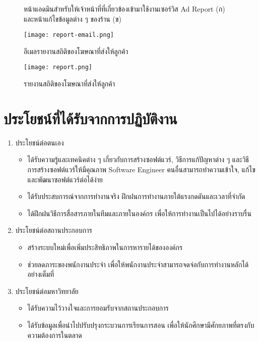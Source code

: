 \begin{figure}[!h]
	\centering
	\caption{หน้าแอดมินสำหรับให้เจ้าหน้าที่ที่เกี่ยวข้องเข้ามาใช้งานเซอร์วิส Ad Report (ก) และหน้าแก้ไขข้อมูลต่าง ๆ ของร้าน (ข)}
	\label{Fig:adminui}
\end{figure}

\begin{figure}[!h]
	\centering
	\texttt{[image: report-email.png]}  
	\caption{อีเมลรายงานสถิติของโฆษณาที่ส่งให้ลูกค้า}
	\label{Fig:report-email}
\end{figure}

\begin{figure}[!p]
	\centering
	\texttt{[image: report.png]}  
	\caption{รายงานสถิติของโฆษณาที่ส่งให้ลูกค้า}
	\label{Fig:report}
\end{figure}

\section{ประโยชน์ที่ได้รับจากการปฏิบัติงาน}
\begin{enumerate}
	\item ประโยชน์ต่อตนเอง
	\begin{itemize}
		\item ได้รับความรู้และเทคนิคต่าง ๆ เกี่ยวกับการสร้างซอฟต์แวร์, วิธีการแก้ปัญหาต่าง ๆ และวิธีการสร้างซอฟต์แวร์ให้มีคุณภาพ Software Engineer คนอื่นสามารถทำความเข้าใจ, แก้ไข และพัฒนาซอฟต์แวร์ต่อได้ง่าย	
		\item ได้รับประสบการณ์จากการทำงานจริง ฝึกฝนการทำงานภายใต้แรงกดดันและเวลาที่จำกัด
		\item ได้ฝึกฝนวิธีการสื่อสารภายในทีมและภายในองค์กร เพื่อให้การทำงานเป็นไปได้อย่างราบรื่น
	\end{itemize}
	\item ประโยชน์ต่อสถานประกอบการ
	\begin{itemize}
		\item สร้างระบบใหม่เพื่อเพิ่มประสิทธิภาพในการหารายได้ขององค์กร
		\item ช่วยลดภาระของพนักงานประจำ เพื่อให้พนักงานประจำสามารถจดจ่อกับการทำงานหลักได้อย่างเต็มที่
	\end{itemize}
	\item ประโยชน์ต่อมหาวิทยาลัย
	\begin{itemize}
		\item ได้รับความไว้วางใจและการยอมรับจากสถานประกอบการ
		\item ได้รับข้อมูลเพื่อนำไปปรับปรุงกระบวนการเรียนการสอน เพื่อให้นักศึกษามีศักยภาพที่ตรงกับความต้องการในตลาด
	\end{itemize}
\end{enumerate}

